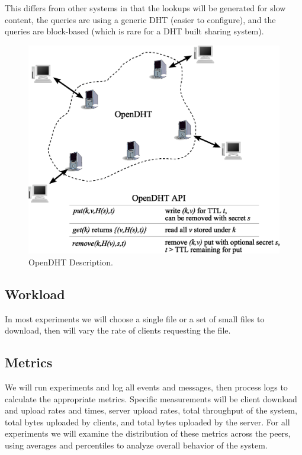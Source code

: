 This differs from other systems in that the lookups will be generated for slow content, the queries are using a generic DHT (easier to configure), and the queries are block-based (which is rare for a DHT built sharing system).

\begin{figure}
  \centering
  \includegraphics[width=12cm]{pics/opendht.eps}
  \caption{OpenDHT Description.}
  \label{fig:opendht_description}
\end{figure}
\subsection{Workload}
In most experiments we will choose a single file or a set of small files to download, then will vary the rate of clients requesting the file.

\subsection{Metrics}
We will run experiments and log all events and messages, then process logs to calculate the appropriate metrics.  Specific measurements will be client download and upload rates and times, server upload rates, total throughput of the system, total bytes uploaded by clients, and total bytes uploaded by the server.  For all experiments we will examine the distribution of these metrics across the peers, using averages and percentiles to analyze overall behavior of the system.

